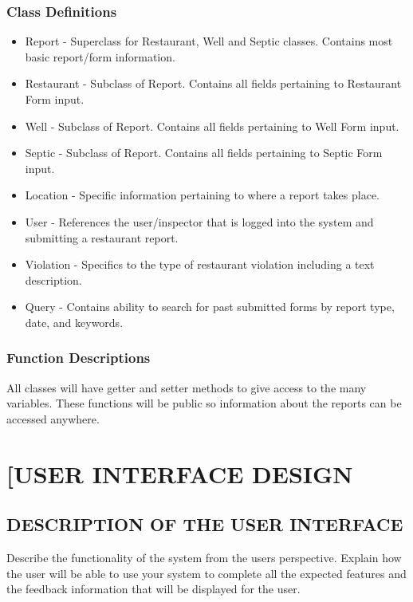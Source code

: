 \documentclass[twoside,letterpaper]{article}
\begin{document}
\subsubsection{Class Definitions}
\begin{itemize}
\item Report - Superclass for Restaurant, Well and Septic classes. Contains most basic report/form information.
\item Restaurant - Subclass of Report. Contains all fields pertaining to Restaurant Form input.
\item Well -  Subclass of Report. Contains all fields pertaining to Well  Form input.
\item Septic - Subclass of Report. Contains all fields pertaining to Septic Form input.
\item Location - Specific information pertaining to where a report takes place.
\item User - References the user/inspector that is logged into the system and submitting a restaurant report.
\item Violation - Specifics to the type of restaurant violation including a text description.
\item Query - Contains ability to search for past submitted forms by report type, date, and keywords.
\end{itemize}
\subsubsection{Function Descriptions}
All classes will have getter and setter methods to give access to the many variables. These functions will be public so information about the reports can be accessed anywhere.

\clearpage\section[USER INTERFACE DESIGN]{\rmfamily\bfseries\color{black}
[USER INTERFACE DESIGN}

\subsection[DESCRIPTION OF THE USER INTERFACE]{\rmfamily\bfseries\color{black}
DESCRIPTION OF THE USER INTERFACE}
{\rmfamily\color{black}
Describe the functionality of the system from the users perspective. Explain how the user
will be able to use your system to complete all the expected features and the feedback
information that will be displayed for the user.
}
\end{document}
